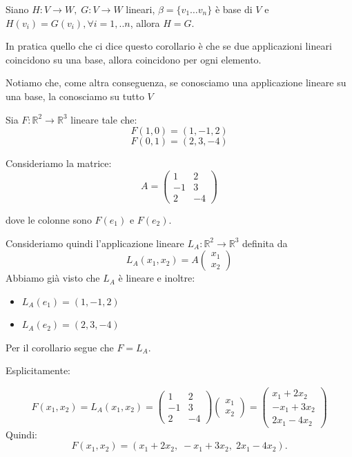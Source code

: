 \documentclass[
  a4paper,
]{article}
\providecommand{\tightlist}{%
  \setlength{\itemsep}{0pt}\setlength{\parskip}{0pt}}
\providecommand{\tightlist}{}
\begin{document}
\begin{propositionbox}[Corollario]
Siano \(H : V \to W, \; G : V \to W\) lineari,
\(\beta = \{v_1 \dots v_n\}\) è base di \(V\) e
\(H(v_i) = G(v_i), \forall i = 1, .. n\), allora \(H = G\).
\end{propositionbox}

In pratica quello che ci dice questo corollario è che se due
applicazioni lineari coincidono su una base, allora coincidono per ogni
elemento.

\begin{observationbox}
Notiamo che, come altra conseguenza, se conosciamo una applicazione
lineare su una base, la conosciamo su tutto \(V\)
\end{observationbox}

\begin{examplebox}
Sia \(F : \mathbb{R}^2 \to \mathbb{R}^3\) lineare tale che: \[
F(1,0) = (1, -1, 2)
\] \[
F(0,1) = (2, 3, -4)
\]

Consideriamo la matrice: \[
A =
\begin{pmatrix}
1 & 2 \\
-1 & 3 \\
2 & -4
\end{pmatrix}
\]

dove le colonne sono \(F(e_1)\) e \(F(e_2)\).

Consideriamo quindi l'applicazione lineare
\(L_A : \mathbb{R}^2 \to \mathbb{R}^3\) definita da\\
\[
L_A(x_1, x_2) = A \begin{pmatrix} x_1 \\ x_2 \end{pmatrix}
\] Abbiamo già visto che \(L_A\) è lineare e inoltre:

\begin{itemize}
\tightlist
\item
  \(L_A(e_1) = (1, -1, 2)\)\\
\item
  \(L_A(e_2) = (2, 3, -4)\)
\end{itemize}

Per il corollario segue che \(F = L_A\).

Esplicitamente:

\[
F(x_1, x_2) =L_A(x_1, x_2) =
\begin{pmatrix}
1 & 2 \\
-1 & 3 \\
2 & -4
\end{pmatrix}
\begin{pmatrix}
x_1 \\
x_2
\end{pmatrix}
=
\begin{pmatrix}
x_1 + 2x_2 \\
- x_1 + 3x_2 \\
2x_1 - 4x_2
\end{pmatrix}
\] Quindi: \[
F(x_1, x_2) = (x_1 + 2x_2,\; -x_1 + 3x_2,\; 2x_1 - 4x_2).
\]
\end{examplebox}
\end{document}
